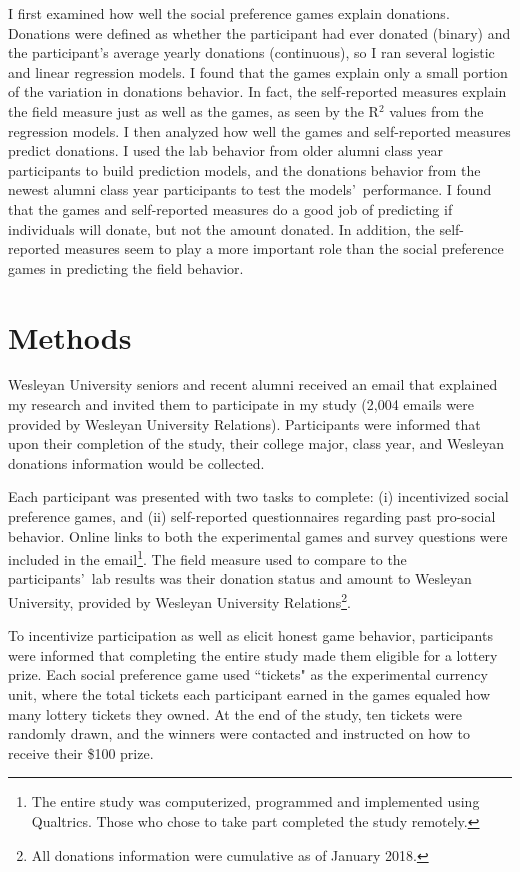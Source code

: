 \documentclass[12pt]{article}
\begin{document}
I first examined how well the social preference games explain donations. Donations were defined as whether the participant had ever donated (binary) and the participant\rq s average yearly donations (continuous), so I ran several logistic and linear regression models. I found that the games explain only a small portion of the variation in donations behavior. In fact, the self-reported measures explain the field measure just as well as the games, as seen by the R$^{2}$ values from the regression models. I then analyzed how well the games and self-reported measures predict donations. I used the lab behavior from older alumni class year participants to build prediction models, and the donations behavior from the newest alumni class year participants to test the models\rq \ performance. I found that the games and self-reported measures do a good job of predicting if individuals will donate, but not the amount donated. In addition, the self-reported measures seem to play a more important role than the social preference games in predicting the field behavior.


\section{Methods}
 
Wesleyan University seniors and recent alumni received an email that explained my research and invited them to participate in my study (2,004 emails were provided by Wesleyan University Relations). Participants were informed that upon their completion of the study, their college major, class year, and Wesleyan donations information would be collected.

Each participant was presented with two tasks to complete: (i) incentivized social preference games, and (ii) self-reported questionnaires regarding past pro-social behavior. Online links to both the experimental games and survey questions were included in the email\footnote{The entire study was computerized, programmed and implemented using Qualtrics. Those who chose to take part completed the study remotely.}. The field measure used to compare to the participants\rq \ lab results was their donation status and amount to Wesleyan University, provided by Wesleyan University Relations\footnote{All donations information were cumulative as of January 2018.}.

To incentivize participation as well as elicit honest game behavior, participants were informed that completing the entire study made them eligible for a lottery prize. Each social preference game used ``tickets" as the experimental currency unit, where the total tickets each participant earned in the games equaled how many lottery tickets they owned. At the end of the study, ten tickets were randomly drawn, and the winners were contacted and instructed on how to receive their \$100 prize.
\end{document}
